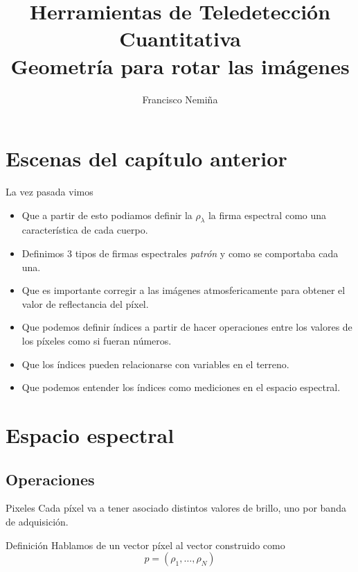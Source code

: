 \documentclass[]{beamer}
\title{Herramientas de Teledetección Cuantitativa\\{\small Geometría para rotar las imágenes}}
\author{Francisco Nemiña}
\institute{Unidad de Educación y Formación Masiva \\
Comisión Nacional de Actividades Espaciales}
\begin{document}
\begin{frame}
    \maketitle
\end{frame}

\section{Escenas del capítulo anterior}
\begin{frame}{La vez pasada vimos}
  \begin{itemize}[<+->]
    \item Que a partir de esto podiamos definir la $\rho_\lambda$ la firma espectral como una característica de cada cuerpo.
    \item Definimos 3 tipos de firmas espectrales \emph{patrón} y como se comportaba cada una.
    \item Que es importante corregir a las imágenes atmosfericamente para obtener el valor de reflectancia del píxel.
    \item Que podemos definir índices a partir de hacer operaciones entre los valores de los píxeles como si fueran números.
    \item Que los índices pueden relacionarse con variables en el terreno.
    \item Que podemos entender los índices como mediciones en el espacio espectral.
  \end{itemize}
\end{frame}

\section{Espacio espectral}
\subsection{Operaciones}
\begin{frame}{Pixeles}
  Cada píxel va a tener asociado distintos valores de brillo, uno por banda de adquisición. \pause
  \begin{block}{Definición}
    Hablamos de un vector píxel al vector construido como
    \begin{equation}
      p = (\rho_1, \ldots ,\rho_N)
    \end{equation}
  \end{block}
\end{frame}
\end{document}
